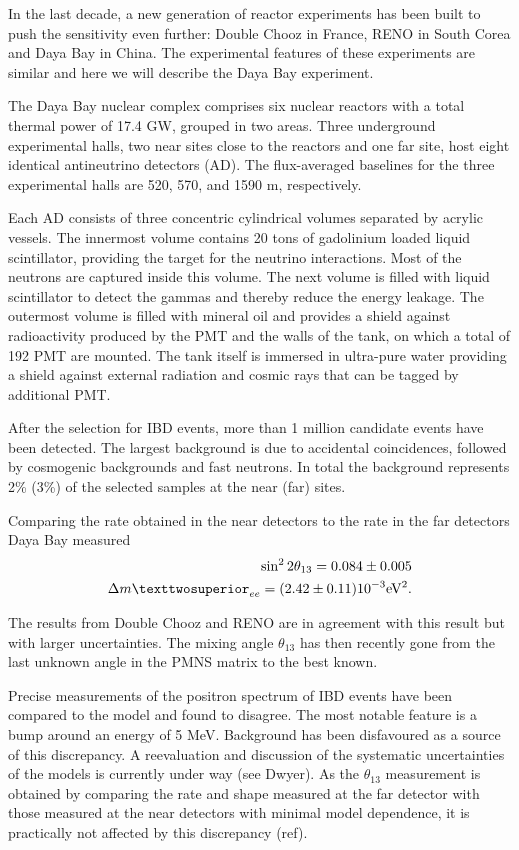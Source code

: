 In the last decade, a new generation of reactor experiments has been built to push the sensitivity even further: Double Chooz in France, RENO in South Corea and Daya Bay in China. The experimental features of these experiments are similar and here we will describe the Daya Bay experiment.

The Daya Bay nuclear complex comprises six nuclear reactors with a total thermal power of 17.4 GW, grouped in two areas. Three underground experimental halls, two near sites close to the reactors and one far site, host eight identical antineutrino detectors (AD).
The flux-averaged baselines
for the three experimental halls are 520, 570, and 1590 m,
respectively.

Each AD consists of three concentric cylindrical volumes separated by acrylic vessels. The innermost volume contains 20 tons of gadolinium loaded liquid scintillator, providing the target for the neutrino interactions. Most of the neutrons are captured inside this volume. The next volume is filled with liquid scintillator to detect the gammas and thereby reduce the energy leakage. The outermost volume is filled with mineral oil and provides a shield against radioactivity produced by the PMT and the walls of the tank, on which a total of 192 PMT are mounted. The tank itself is immersed in ultra-pure water providing a shield against external radiation and cosmic rays that can be tagged by additional PMT. 

After the selection for IBD events, more than 1 million candidate events have been detected. The largest background is due to accidental coincidences, followed by cosmogenic backgrounds and fast neutrons. In total the background represents 2\% (3\%) of the selected samples at the near (far) sites.

Comparing the rate obtained in the near detectors to the rate in the far detectors Daya Bay measured 
\begin{eqnarray}
\sin^2 2 \theta_{13} = 0.084 \pm 0.005 \\
\Delta m²_{ee} = (2.42 \pm 0.11) 10^{-3} {\rm eV^2}.
\end{eqnarray}

The results from Double Chooz and RENO are in agreement with this result but with larger uncertainties. The mixing angle $\theta_{13}$ has then recently gone from the last unknown angle in the PMNS matrix to the best known.

Precise measurements of the positron spectrum of IBD events have been compared to the model and found to disagree. The most notable feature is a bump around an energy of 5 MeV. Background has been disfavoured as a source of this discrepancy. A reevaluation and discussion of the systematic uncertainties of the models is currently under way (see Dwyer).
As the $\theta_{13}$ measurement is obtained by comparing the rate and shape measured at the far detector with those measured at the near detectors with minimal model dependence, it is practically not affected by this discrepancy (ref).



